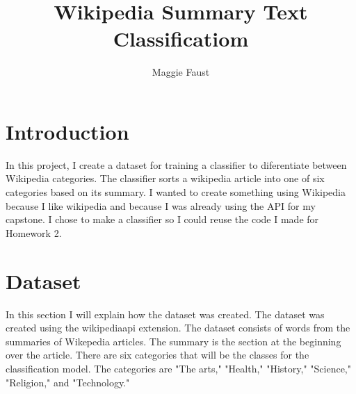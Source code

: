 \documentclass[11pt]{article}
\title{Wikipedia Summary Text Classificatiom}
\author{Maggie Faust}
\begin{document}
\maketitle

\section{Introduction}

In this project, I create a dataset for training a classifier to diferentiate between Wikipedia categories. The classifier sorts a wikipedia article into one of six categories based on its summary. I wanted to create something using Wikipedia because I like wikipedia and because I was already using the API for my capstone. I chose to make a classifier so I could reuse the code I made for Homework 2.

\section{Dataset}

In this section I will explain how the dataset was created. The dataset was created using the wikipediaapi extension. The dataset consists of words from the summaries of Wikepedia articles. The summary is the section at the beginning over the article. There are six categories that will be the classes for the classification model. The categories are "The arts," "Health," "History," "Science," "Religion," and "Technology." 
\end{document}
